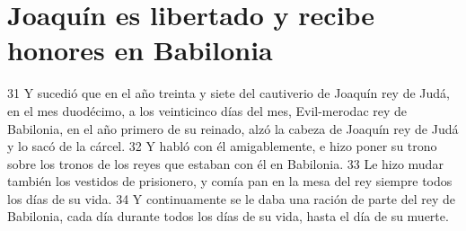 \section*{Joaquín es libertado y recibe honores en Babilonia}

31 Y sucedió que en el año treinta y siete del cautiverio de Joaquín rey de Judá, en el mes duodécimo, a los veinticinco días del mes, Evil-merodac rey de Babilonia, en el año primero de su reinado, alzó la cabeza de Joaquín rey de Judá y lo sacó de la cárcel.
32 Y habló con él amigablemente, e hizo poner su trono sobre los tronos de los reyes que estaban con él en Babilonia.
33 Le hizo mudar también los vestidos de prisionero, y comía pan en la mesa del rey siempre todos los días de su vida.
34 Y continuamente se le daba una ración de parte del rey de Babilonia, cada día durante todos los días de su vida, hasta el día de su muerte.


